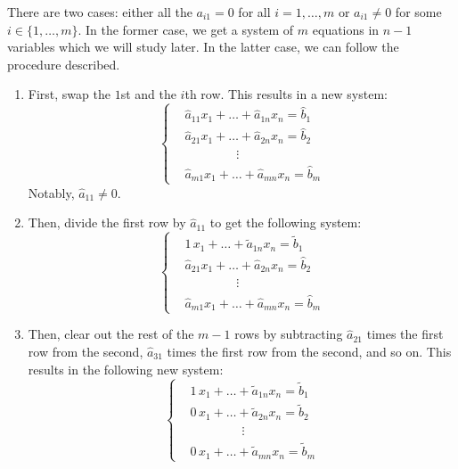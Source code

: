 \documentclass[main.tex]{subfiles}
\begin{document}
There are two cases: either all the $a_{i1} = 0$ for all $i = 1, \ldots , m$ or $a_{i1} \neq 0$ for some $i\in \{1, \ldots , m\}$. In the former case, we get a system of $m$ equations in $n - 1$ variables which we will study later. In the latter case, we can follow the procedure described.
\begin{enumerate}
    \item First, swap the $1$st and the $i$th row. This results in a new system:
    \[\left\{\begin{aligned}
        &\hat{a}_{11}x_1 + \ldots + \hat{a}_{1n}x_n = \hat{b}_1 \\
        &\hat{a}_{21}x_1 + \ldots + \hat{a}_{2n}x_n = \hat{b}_2 \\
        &\phantom{hello guys}\vdots \\
        &\hat{a}_{m1}x_1 + \ldots + \hat{a}_{mn}x_n = \hat{b}_m
    \end{aligned}\right.\]
    Notably, $\hat{a}_{11}\neq 0$.
    \item Then, divide the first row by $\hat{a}_{11}$ to get the following system:
    \[\left\{\begin{aligned}
        &\boxed{1}\,x_1 + \ldots + \tilde{a}_{1n}x_n = \tilde{b}_1 \\
        &\hat{a}_{21}x_1 + \ldots + \hat{a}_{2n}x_n = \hat{b}_2 \\
        &\phantom{hello guys}\vdots \\
        &\hat{a}_{m1}x_1 + \ldots + \hat{a}_{mn}x_n = \hat{b}_m
    \end{aligned}\right.\]
    \item Then, clear out the rest of the $m - 1$ rows by subtracting $\hat{a}_{21}$ times the first row from the second, $\hat{a}_{31}$ times the first row from the second, and so on. This results in the following new system:
    \[\left\{\begin{aligned}
        &\boxed{1}\,x_1 + \ldots + \tilde{a}_{1n}x_n = \tilde{b}_1 \\
        &\boxed{0}\,x_1 + \ldots + \tilde{a}_{2n}x_n = \tilde{b}_2 \\
        &\phantom{hello guys}\vdots \\
        &\boxed{0}\,x_1 + \ldots + \tilde{a}_{mn}x_n = \tilde{b}_m
    \end{aligned}\right.\]
\end{enumerate}
\end{document}
